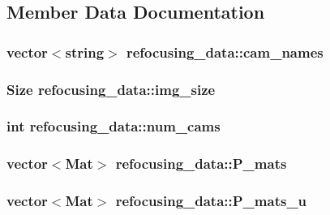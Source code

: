 \subsection{Member Data Documentation}
\hypertarget{structrefocusing__data_a421d950a036ba0cb9682c138ad4db8d2}{
\subsubsection[{cam\-\_\-names}]{\setlength{\rightskip}{0pt plus 5cm}vector$<$string$>$ refocusing\-\_\-data\-::cam\-\_\-names}}\label{d3/d46/structrefocusing__data_a421d950a036ba0cb9682c138ad4db8d2}
\hypertarget{structrefocusing__data_aa42c7150b1f4a8e0805e124f7e03dc37}{
\subsubsection[{img\-\_\-size}]{\setlength{\rightskip}{0pt plus 5cm}Size refocusing\-\_\-data\-::img\-\_\-size}}\label{d3/d46/structrefocusing__data_aa42c7150b1f4a8e0805e124f7e03dc37}
\hypertarget{structrefocusing__data_ab325738b480b6187ec23385eae36c78c}{
\subsubsection[{num\-\_\-cams}]{\setlength{\rightskip}{0pt plus 5cm}int refocusing\-\_\-data\-::num\-\_\-cams}}\label{d3/d46/structrefocusing__data_ab325738b480b6187ec23385eae36c78c}
\hypertarget{structrefocusing__data_a3cdccbbbf32a70f5049d6d4fa83fe6da}{
\subsubsection[{P\-\_\-mats}]{\setlength{\rightskip}{0pt plus 5cm}vector$<$Mat$>$ refocusing\-\_\-data\-::\-P\-\_\-mats}}\label{d3/d46/structrefocusing__data_a3cdccbbbf32a70f5049d6d4fa83fe6da}
\hypertarget{structrefocusing__data_aea3885e85150df53e2c8d65203e7c0bf}{
\subsubsection[{P\-\_\-mats\-\_\-u}]{\setlength{\rightskip}{0pt plus 5cm}vector$<$Mat$>$ refocusing\-\_\-data\-::\-P\-\_\-mats\-\_\-u}}\label{d3/d46/structrefocusing__data_aea3885e85150df53e2c8d65203e7c0bf}
